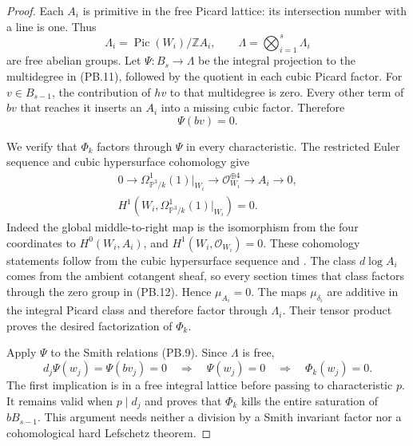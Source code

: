 \begin{proof}
Each $A_i$ is primitive in the free Picard lattice: its intersection
number with a line is one. Thus
\[
 \Lambda_i=\operatorname{Pic}(W_i)/\mathbb ZA_i,
 \qquad \Lambda=\bigotimes_{i=1}^s\Lambda_i
\]
are free abelian groups. Let $\Psi:B_s\to\Lambda$ be the integral
projection to the multidegree in (PB.11), followed by the quotient
in each cubic Picard factor. For $v\in B_{s-1}$, the contribution
of $hv$ to that multidegree is zero. Every other term of $bv$ that
reaches it inserts an $A_i$ into a missing cubic factor. Therefore
\[
                         \Psi(bv)=0.
\]

We verify that $\Phi_k$ factors through $\Psi$ in every characteristic.
The restricted Euler sequence and cubic hypersurface cohomology give
\[
 \begin{gathered}
 0\longrightarrow\Omega^1_{\mathbb P^3/k}(1)|_{W_i}
       \longrightarrow\mathcal O_{W_i}^{\oplus4}
       \longrightarrow A_i\longrightarrow0,\\
 H^1(W_i,\Omega^1_{\mathbb P^3/k}(1)|_{W_i})=0.
 \end{gathered}
 \tag{PB.12}
\]
Indeed the global middle-to-right map is the isomorphism from the
four coordinates to $H^0(W_i,A_i)$, and
$H^1(W_i,\mathcal O_{W_i})=0$. These cohomology statements follow
from the cubic hypersurface sequence and
\citet[Lemmas 30.8.1--30.8.2, Tag 01XS]{frPrimitiveProjectiveCohomology}.
The class $d\log A_i$ comes from the ambient cotangent sheaf, so
every section times that class factors through the zero group in
(PB.12). Hence $\mu_{A_i}=0$. The maps $\mu_{\delta_i}$ are additive
in the integral Picard class and therefore factor through $\Lambda_i$.
Their tensor product proves the desired factorization of $\Phi_k$.

Apply $\Psi$ to the Smith relations (PB.9). Since $\Lambda$ is free,
\[
 d_j\Psi(w_j)=\Psi(bv_j)=0
 \quad\Longrightarrow\quad\Psi(w_j)=0
 \quad\Longrightarrow\quad\Phi_k(w_j)=0.
 \tag{PB.13}
\]
The first implication is in a free integral lattice before passing
to characteristic $p$. It remains valid when $p\mid d_j$ and proves
that $\Phi_k$ kills the entire saturation of $bB_{s-1}$.
This argument needs neither a division by a Smith invariant factor
nor a cohomological hard Lefschetz theorem.


\end{proof}
